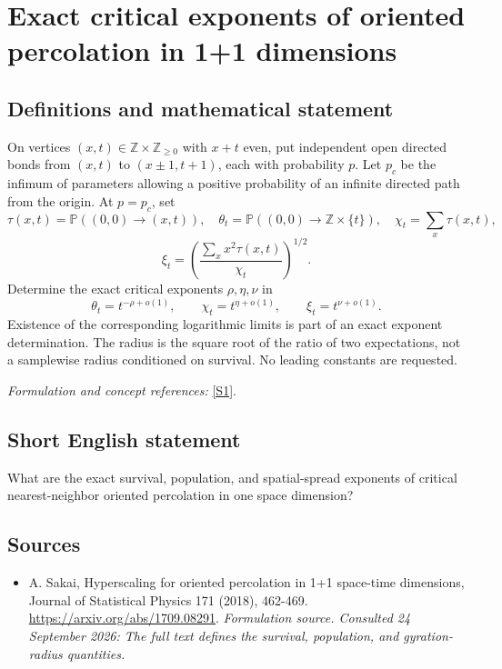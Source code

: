 \documentclass[11pt]{article}
\begin{document}
\section*{\texorpdfstring{Exact critical exponents of oriented percolation in 1+1 dimensions}{Exact critical exponents of oriented percolation in 1+1 dimensions}}\label{statement}
\subsection{Definitions and mathematical statement}
On vertices $(x,t)\in{\mathbb{Z}}\times{\mathbb{Z}}_{\ge0}$ with $x+t$ even, put independent open directed bonds from $(x,t)$ to $(x\pm1,t+1)$, each with probability $p$. Let $p_c$ be the infimum of parameters allowing a positive probability of an infinite directed path from the origin. At $p=p_c$, set
\[
 \tau(x,t)={\mathbb{P}}((0,0)\to(x,t)),\quad
 \theta_t={\mathbb{P}}((0,0)\to{\mathbb{Z}}\times\{t\}),\quad
 \chi_t=\sum_x\tau(x,t),
\]
\[
 \xi_t=\left(\frac{\sum_xx^2\tau(x,t)}{\chi_t}\right)^{1/2}.
\]
Determine the exact critical exponents $\rho,\eta,\nu$ in
\[
 \theta_t=t^{-\rho+o(1)},\qquad
 \chi_t=t^{\eta+o(1)},\qquad \xi_t=t^{\nu+o(1)}.
\]
Existence of the corresponding logarithmic limits is part of an exact exponent determination. The radius is the square root of the ratio of two expectations, not a samplewise radius conditioned on survival. No leading constants are requested.
\par\smallskip\textit{Formulation and concept references:} \href{https://arxiv.org/abs/1709.08291}{[S1]}.

\subsection{Short English statement}
What are the exact survival, population, and spatial-spread exponents of critical nearest-neighbor oriented percolation in one space dimension?
\subsection{Sources}
\begin{itemize}
\item[S1]A. Sakai, Hyperscaling for oriented percolation in 1+1 space-time dimensions, Journal of Statistical Physics 171 (2018), 462-469.
\url{https://arxiv.org/abs/1709.08291}.
\textit{Formulation source. Consulted 24 September 2026: The full text defines the survival, population, and gyration-radius quantities.}
\end{itemize}
\end{document}
